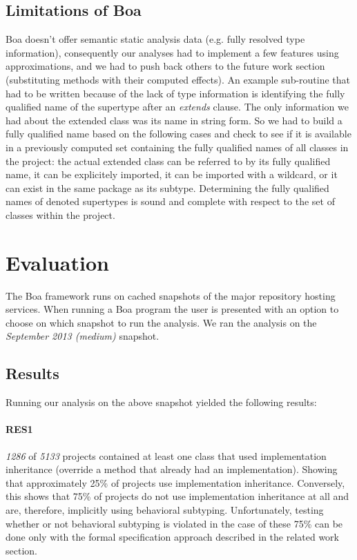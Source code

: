 \documentclass{acm_proc_article-sp}
\begin{document}
\subsection{Limitations of Boa}
Boa doesn't offer semantic static analysis data (e.g. fully resolved type information), consequently our analyses had to implement a few features using approximations, and we had to push back others to the future work section (substituting methods with their computed effects). An example sub-routine that had to be written because of the lack of type information is identifying the fully qualified name of the supertype after an \emph{extends} clause. The only information we had about the extended class was its name in string form. So we had to build a fully qualified name based on the following cases and check to see if it is available in a previously computed set containing the fully qualified names of all classes in the project: the actual extended class can be referred to by its fully qualified name, it can be explicitely imported, it can be imported with a wildcard, or it can exist in the same package as its subtype. Determining the fully qualified names of denoted supertypes is sound and complete with respect to the set of classes within the project.

\section{Evaluation}
The Boa framework runs on cached snapshots of the major repository hosting services. When running a Boa program the user is presented with an option to choose on which snapshot to run the analysis. We ran the analysis on the \emph{September 2013 (medium)} snapshot.

\subsection{Results}
Running our analysis on the above snapshot yielded the following results:
\paragraph{RES1}
\emph{1286} of \emph{5133} projects contained at least one class that used implementation inheritance (override a method that already had an implementation). Showing that approximately 25\% of projects use implementation inheritance. Conversely, this shows that 75\% of projects do not use implementation inheritance at all and are, therefore, implicitly using behavioral subtyping. Unfortunately, testing whether or not behavioral subtyping is violated in the case of these 75\% can be done only with the formal specification approach described in the related work section.
\end{document}
